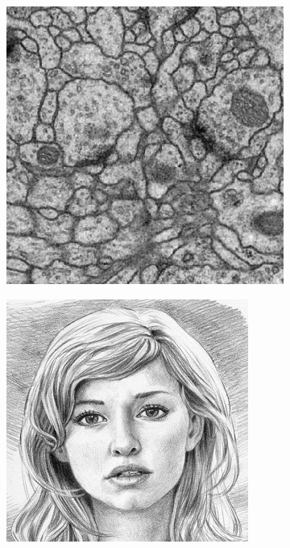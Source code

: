 \documentclass[12pt, a4paper]{scrartcl}
\begin{document}
\begin{figure}[H]
\centering
\begin{subfigure}{.34\textwidth}
  \centering
  \includegraphics[width=.9\linewidth]{ISBI0}

  \label{fig:nas101}
\end{subfigure}%
\begin{subfigure}{.28\textwidth}
  \centering
  \includegraphics[width=.99\linewidth]{style10}


\end{subfigure}
\end{figure}
\end{document}
